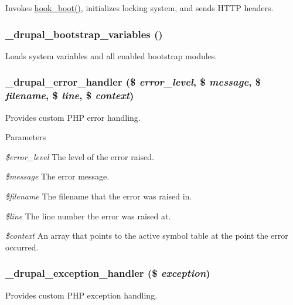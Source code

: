 \label{bootstrap_8inc_aaec7ee804d0de51e5632a28a286578aa}
Invokes \hyperlink{group__hooks_ga9ac1dfffdc69471a3d00d67503c71577}{hook\_\-boot()}, initializes locking system, and sends HTTP headers. \hypertarget{bootstrap_8inc_a2ea55f223f5f1c6ddcfcdfe4a11782db}{
\subsubsection[{\_\-drupal\_\-bootstrap\_\-variables}]{\setlength{\rightskip}{0pt plus 5cm}\_\-drupal\_\-bootstrap\_\-variables ()}}
\label{bootstrap_8inc_a2ea55f223f5f1c6ddcfcdfe4a11782db}
Loads system variables and all enabled bootstrap modules. \hypertarget{bootstrap_8inc_a81d5c3fc0ad3470c5071a001ba9b5a8b}{
\subsubsection[{\_\-drupal\_\-error\_\-handler}]{\setlength{\rightskip}{0pt plus 5cm}\_\-drupal\_\-error\_\-handler (\$ {\em error\_\-level}, \/  \$ {\em message}, \/  \$ {\em filename}, \/  \$ {\em line}, \/  \$ {\em context})}}
\label{bootstrap_8inc_a81d5c3fc0ad3470c5071a001ba9b5a8b}
Provides custom PHP error handling.


\begin{DoxyParams}{Parameters}
\item[{\em \$error\_\-level}]The level of the error raised. \item[{\em \$message}]The error message. \item[{\em \$filename}]The filename that the error was raised in. \item[{\em \$line}]The line number the error was raised at. \item[{\em \$context}]An array that points to the active symbol table at the point the error occurred. \end{DoxyParams}
\hypertarget{bootstrap_8inc_a42a79128a6db4edc9865224a2b90f8f5}{
\subsubsection[{\_\-drupal\_\-exception\_\-handler}]{\setlength{\rightskip}{0pt plus 5cm}\_\-drupal\_\-exception\_\-handler (\$ {\em exception})}}
\label{bootstrap_8inc_a42a79128a6db4edc9865224a2b90f8f5}
Provides custom PHP exception handling.

